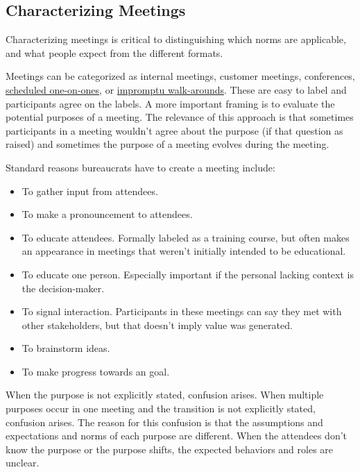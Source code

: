 \subsection*{Characterizing Meetings\label{sec:characterizing-meetings}}
Characterizing meetings is critical to distinguishing which norms are applicable, and what people expect from the different formats. 


Meetings can be categorized as internal meetings, customer meetings, conferences, \hyperref[sec:meetings-one-on-one]{scheduled one-on-ones}\iftoggle{has page numbers}{ (see page~\pageref{sec:meetings-one-on-one})}{}, or
\hyperref[sec:walk-arounds]{impromptu walk-arounds}\iftoggle{haspagenumbers}{ (see page~\pageref{sec:walk-arounds})}{}. These are easy to label and participants agree on the labels.
A more important framing is to evaluate the potential purposes of a meeting. The relevance of this approach is that sometimes participants in a meeting wouldn't agree about the purpose (if that question as raised) and sometimes the purpose of a meeting evolves during the meeting. 

Standard reasons bureaucrats have to create a meeting include:
\begin{itemize}
    \item To gather input from attendees.
    \item To make a pronouncement to attendees.
    \item To educate attendees. Formally labeled as a training course, but often makes an appearance in meetings that weren't initially intended to be educational. 
    \item To educate one person. Especially important if the personal lacking context is the decision-maker. 
    \item To signal interaction. Participants in these meetings can say they met with other stakeholders, but that doesn't imply value was generated. 
    \item To brainstorm ideas.
    \item To make progress towards an goal.
\end{itemize}
When the purpose is not explicitly stated, confusion arises. 
When multiple purposes occur in one meeting and the transition is not explicitly stated, confusion arises.
The reason for this confusion is that the assumptions and expectations and norms of each purpose are different. When the attendees don't know the purpose or the purpose shifts, the expected behaviors and roles are unclear. 

